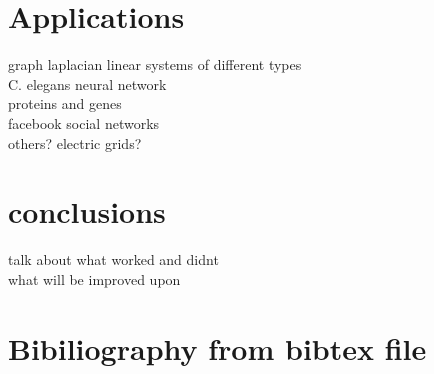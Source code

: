 \documentclass{article}
\begin{document}
\section{Applications}
graph laplacian linear systems of different types\\
C. elegans neural network\\
proteins and genes\\
facebook social networks\\
others? electric grids?\\

\section{conclusions}
talk about what worked and didnt\\
what will be improved upon\\

\section{Bibiliography from bibtex file}


\end{document}
